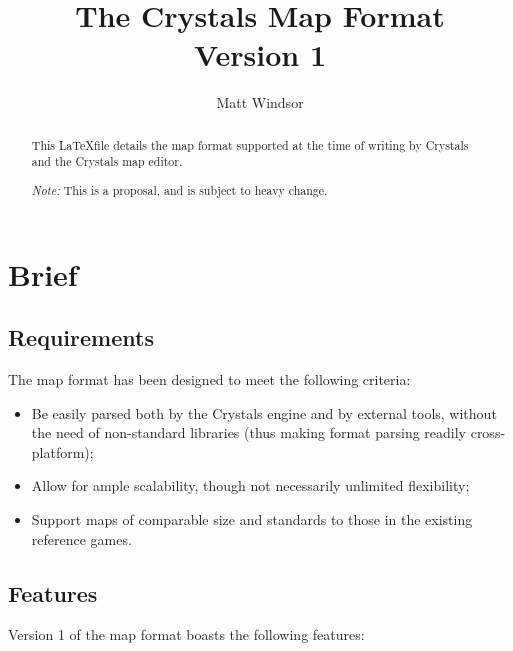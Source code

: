 \documentclass [12pt,a4paper]{article}
\author{Matt Windsor}
\title{The Crystals Map Format\\Version 1}
\date{}
\begin{document}
\maketitle{}

\begin{abstract}
  This \LaTeX file details the map format supported at the time of
  writing by Crystals and the Crystals map editor.

  \emph{Note:} This is a proposal, and is subject to heavy
  change.

\end{abstract}

\section{Brief}

\subsection{Requirements}

The map format has been designed to meet the following criteria:

\begin{itemize}

  \item Be easily parsed both by the Crystals engine and by external
    tools, without the need of non-standard libraries (thus making
    format parsing readily cross-platform);

  \item Allow for ample scalability, though not necessarily unlimited
    flexibility;

  \item Support maps of comparable size and standards to those in the
    existing reference games.

\end{itemize}

\subsection{Features}

Version 1 of the map format boasts the following features:
\end{document}
